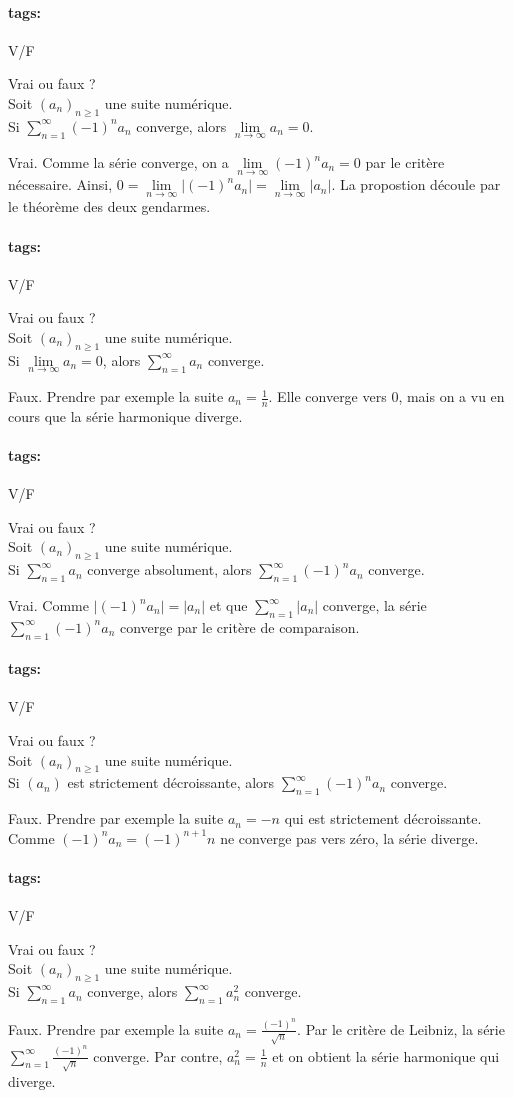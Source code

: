 \documentclass[12pt]{article}
\newcommand*{\xfield}[1]{\begin{mdframed}\centering #1\end{mdframed}\bigskip}
\newenvironment{note}{}{}
\newcommand*{\tags}[1]{\paragraph{tags: }#1}
\begin{document}
\begin{note}
\tags{V/F}
	\xfield{Vrai ou faux ?\\
	Soit $(a_n)_{n\ge 1}$ une suite numérique.\\
	Si $\sum\limits^{\infty}_{n=1} (-1)^n a_n$ converge, alors $\lim\limits_{n \to \infty} a_n = 0$.}
	\xfield{Vrai. Comme la série converge, on a $\lim\limits_{n \to \infty} (-1)^n a_n = 0$ par le critère nécessaire. Ainsi, $0=\lim\limits_{n \to \infty} \vert (-1)^n a_n\vert = \lim\limits_{n \to \infty} \vert a_n \vert$. La propostion découle par le théorème des deux gendarmes.}
\end{note}

\begin{note}
\tags{V/F}
	\xfield{Vrai ou faux ?\\
	Soit $(a_n)_{n\ge 1}$ une suite numérique.\\
	Si $\lim\limits_{n \to \infty} a_n = 0$, alors  $\sum\limits^{\infty}_{n=1} a_n$ converge.}
	\xfield{Faux. Prendre par exemple la suite $a_n = \frac{1}{n}$. Elle converge vers $0$, mais on a vu en cours que la série harmonique diverge.}
\end{note}

\begin{note}
\tags{V/F}
	\xfield{Vrai ou faux ?\\
	Soit $(a_n)_{n\ge 1}$ une suite numérique.\\
	Si $\sum\limits^{\infty}_{n=1} a_n$ converge absolument, alors $\sum\limits^{\infty}_{n=1} (-1)^n a_n$ converge.}
	\xfield{Vrai. Comme $\vert (-1)^n a_n\vert = \vert a_n \vert$ et que $\sum\limits^{\infty}_{n=1} \vert a_n \vert$ converge, la série $\sum\limits^{\infty}_{n=1} (-1)^n a_n$ converge par le critère de comparaison.}
\end{note}

\begin{note}
\tags{V/F}
	\xfield{Vrai ou faux ?\\
	Soit $(a_n)_{n\ge 1}$ une suite numérique.\\
	Si $(a_n)$ est strictement décroissante, alors $\sum\limits^{\infty}_{n=1} (-1)^n a_n$ converge.}
	\xfield{Faux. Prendre par exemple la suite $a_n = -n$ qui est strictement décroissante. Comme $(-1)^n a_n = (-1)^{n+1}n$ ne converge pas vers zéro, la série diverge.}
\end{note}

\begin{note}
\tags{V/F}
	\xfield{Vrai ou faux ?\\
	Soit $(a_n)_{n\ge 1}$ une suite numérique.\\
	Si $\sum\limits^{\infty}_{n=1} a_n$ converge, alors $\sum\limits^{\infty}_{n=1} a^2_n$ converge.}
	\xfield{Faux. Prendre par exemple la suite $a_n = \frac{(-1)^n}{\sqrt{n}}$. Par le critère de Leibniz, la série  $\sum\limits^{\infty}_{n=1}\frac{(-1)^n}{\sqrt{n}}$ converge. Par contre, $a_n^2 = \frac{1}{n}$ et on obtient la série harmonique qui diverge. }
\end{note}
\end{document}
